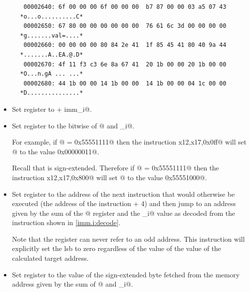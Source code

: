 \begin{figure}[ht]
\centering
\begin{verbatim}
 00002640: 6f 00 00 00 6f 00 00 00  b7 87 00 00 03 a5 07 43 *o...o..........C*
 00002650: 67 80 00 00 00 00 00 00  76 61 6c 3d 00 00 00 00 *g.......val=....*
 00002660: 00 00 00 00 80 84 2e 41  1f 85 45 41 80 40 9a 44 *.......A..EA.@.D*
 00002670: 4f 11 f3 c3 6e 8a 67 41  20 1b 00 00 20 1b 00 00 *O...n.gA ... ...*
 00002680: 44 1b 00 00 14 1b 00 00  14 1b 00 00 04 1c 00 00 *D...............*
\end{verbatim}
\label{Figure:imm:memory:dump}
\end{figure}


\begin{itemize}
\item{}
\label{insn:addi}

Set register \verb@rd@ to  + imm_i@.

\item{}
\label{insn:andi}

Set register \verb@rd@ to the bitwise \verb@and@ of @ and \verb@imm_i@.

For example, if @ = \verb@0x55551111@ then the instruction
\verb@andi x12,x17,0x0ff@ will set @ to the value \verb@0x00000011@.

Recall that \verb@imm@ is sign-extended.
Therefore if @ = \verb@0x55551111@ then the instruction
\verb@andi x12,x17,0x800@ will set @ to the value \verb@0x55551000@.

\item{}
\label{insn:jalr}

Set register \verb@rd@ to the address of the next instruction that would
otherwise be executed (the address of the \verb@jalr@ instruction + 4) and then
jump to an address given by the sum of the @ register and the
\verb@imm_i@ value as decoded from the instruction shown in \autoref{imm.i:decode}.

Note that the \verb@pc@ register can never refer to an odd address.
This instruction will explicitly set the \acrshort{lsb} to zero regardless
of the value of the value of the calculated target address.

\item{}
\label{insn:lb}

Set register \verb@rd@ to the value of the sign-extended byte fetched from
the memory address given by the sum of @ and \verb@imm_i@.


\end{itemize}
